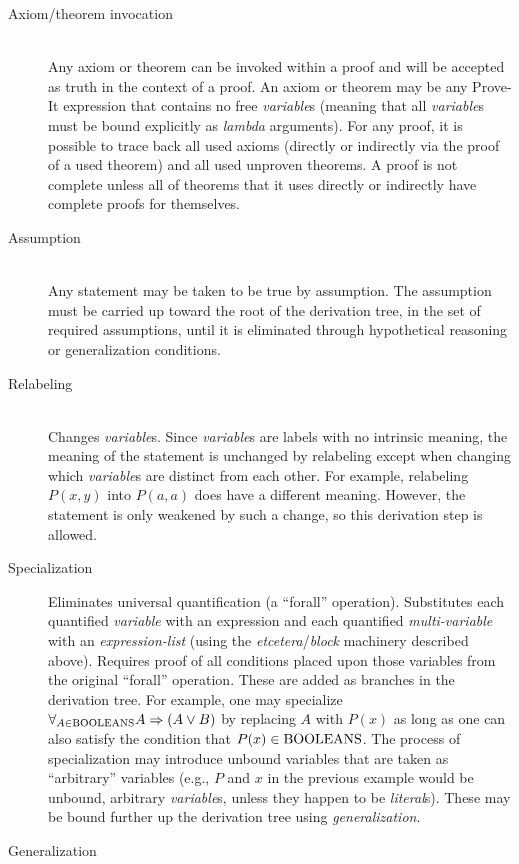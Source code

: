 \documentclass{article}[12pt]
\begin{document}
\begin{description}
\item[Axiom/theorem invocation] \hfill \\
  Any axiom or theorem can be invoked within a proof and will be accepted as truth in the context of a proof.  An axiom or theorem may be any Prove-It expression that contains no free {\em variable}s (meaning that all {\em variable}s must be bound explicitly as {\em lambda} arguments).  For any proof, it is possible to trace back all used axioms (directly or indirectly via the proof of a used theorem) and all used unproven theorems.  A proof is not complete unless all of theorems that it uses directly or indirectly have complete proofs for themselves.
\item[Assumption] \hfill \\
  Any statement may be taken to be true by assumption.  The assumption must be carried up toward the root of the derivation tree, in the set of required assumptions, until it is eliminated through hypothetical reasoning or generalization conditions.
\item[Relabeling] \hfill \\
  Changes {\em variable}s.  Since {\em variable}s are labels with no intrinsic meaning, the meaning of the statement is unchanged by relabeling except when changing which {\em variable}s are distinct from each other.  For example, relabeling $P(x,y)$ into $P(a,a)$ does have a different meaning.  However, the statement is only weakened by such a change, so this derivation step is allowed.
\item[Specialization] Eliminates universal quantification (a “forall” operation).  Substitutes each quantified {\em variable} with an expression and each quantified {\em multi-variable} with an {\em expression-list} (using the {\em etcetera}/{\em block} machinery described above).  Requires proof of all conditions placed upon those variables from the original “forall” operation.  These are added as branches in the derivation tree.  For example, one may specialize $\forall_{A \in {\rm BOOLEANS}} A \Rightarrow (A \lor B)$ by replacing $A$ with $P(x)$ as long as one can also satisfy the condition that $P(x) \in {\rm BOOLEANS}$.  The process of specialization may introduce unbound variables that are taken as “arbitrary” variables (e.g., $P$ and $x$ in the previous example would be unbound, arbitrary {\em variable}s, unless they happen to be {\em literal}s).  These may be bound further up the derivation tree using {\em generalization}.
\item[Generalization] \hfill \\

\end{description}
\end{document}
